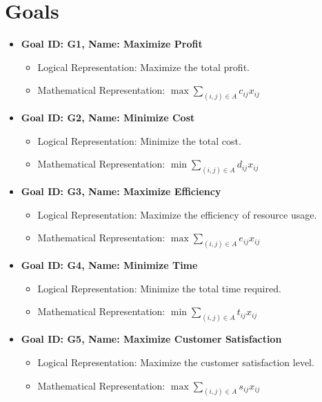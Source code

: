 \documentclass{article}
\begin{document}
\section{Goals}
\begin{itemize}
    \item \textbf{Goal ID: G1, Name: Maximize Profit}
    \begin{itemize}
        \item Logical Representation: Maximize the total profit.
        \item Mathematical Representation: $\max \sum_{(i,j) \in A} c_{ij} x_{ij}$
    \end{itemize}

    \item \textbf{Goal ID: G2, Name: Minimize Cost}
    \begin{itemize}
        \item Logical Representation: Minimize the total cost.
        \item Mathematical Representation: $\min \sum_{(i,j) \in A} d_{ij} x_{ij}$
    \end{itemize}

    \item \textbf{Goal ID: G3, Name: Maximize Efficiency}
    \begin{itemize}
        \item Logical Representation: Maximize the efficiency of resource usage.
        \item Mathematical Representation: $\max \sum_{(i,j) \in A} e_{ij} x_{ij}$
    \end{itemize}

    \item \textbf{Goal ID: G4, Name: Minimize Time}
    \begin{itemize}
        \item Logical Representation: Minimize the total time required.
        \item Mathematical Representation: $\min \sum_{(i,j) \in A} t_{ij} x_{ij}$
    \end{itemize}

    \item \textbf{Goal ID: G5, Name: Maximize Customer Satisfaction}
    \begin{itemize}
        \item Logical Representation: Maximize the customer satisfaction level.
        \item Mathematical Representation: $\max \sum_{(i,j) \in A} s_{ij} x_{ij}$
    \end{itemize}
\end{itemize}
\end{document}
